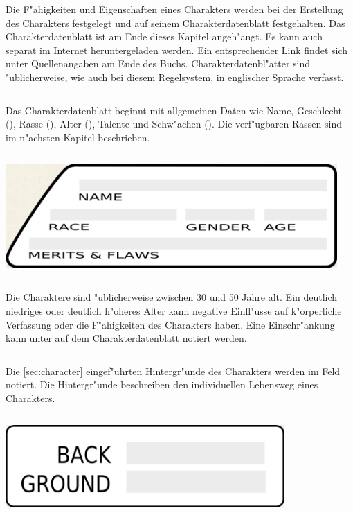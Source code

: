 
Die F"ahigkeiten und Eigenschaften eines Charakters werden bei der Erstellung des Charakters festgelegt und auf seinem Charakterdatenblatt festgehalten. Das Charakterdatenblatt ist am Ende dieses Kapitel angeh"angt. Es kann auch separat im Internet heruntergeladen werden. Ein entsprechender Link findet sich unter Quellenangaben am Ende des Buchs. Charakterdatenbl"atter sind "ublicherweise, wie auch bei diesem Regelsystem, in englischer Sprache verfasst.

\begin{column}[l]{0.48}
    Das Charakterdatenblatt beginnt mit allgemeinen Daten wie Name, Geschlecht (), Rasse (), Alter (), Talente und Schw"achen (). Die verf"ugbaren Rassen sind im n"achsten Kapitel beschrieben.
\end{column}
\begin{column}[r]{0.52}
    \centering
    \includegraphics[width=0.95\textwidth]{images/character_base_stats.jpg}
    \medskip   
\end{column}
\medskip


Die Charaktere sind "ublicherweise zwischen 30 und 50 Jahre alt. Ein deutlich niedriges oder deutlich h"oheres Alter kann negative Einfl"usse auf k"orperliche Verfassung oder die F"ahigkeiten des Charakters haben. Eine Einschr"ankung kann unter  auf dem Charakterdatenblatt notiert werden.


\begin{column}[l]{0.52}
    Die \cref{sec:character} eingef"uhrten Hintergr"unde des Charakters werden im Feld  notiert. Die Hintergr"unde beschreiben den individuellen Lebensweg eines Charakters.
\end{column}
\begin{column}[r]{0.48}
    \centering
    \includegraphics[width=0.80\textwidth]{images/character_background.jpg}    
\end{column}

